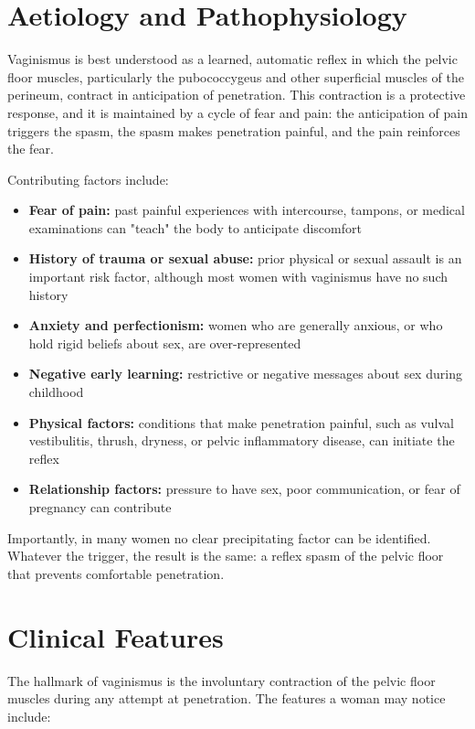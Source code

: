 \section*{Aetiology and Pathophysiology}
Vaginismus is best understood as a learned, automatic reflex in which the pelvic floor muscles, particularly the pubococcygeus and other superficial muscles of the perineum, contract in anticipation of penetration. This contraction is a protective response, and it is maintained by a cycle of fear and pain: the anticipation of pain triggers the spasm, the spasm makes penetration painful, and the pain reinforces the fear.

Contributing factors include:
\begin{itemize}
    \item \textbf{Fear of pain:} past painful experiences with intercourse, tampons, or medical examinations can "teach" the body to anticipate discomfort
    \item \textbf{History of trauma or sexual abuse:} prior physical or sexual assault is an important risk factor, although most women with vaginismus have no such history
    \item \textbf{Anxiety and perfectionism:} women who are generally anxious, or who hold rigid beliefs about sex, are over-represented
    \item \textbf{Negative early learning:} restrictive or negative messages about sex during childhood
    \item \textbf{Physical factors:} conditions that make penetration painful, such as vulval vestibulitis, thrush, dryness, or pelvic inflammatory disease, can initiate the reflex
    \item \textbf{Relationship factors:} pressure to have sex, poor communication, or fear of pregnancy can contribute
\end{itemize}

Importantly, in many women no clear precipitating factor can be identified. Whatever the trigger, the result is the same: a reflex spasm of the pelvic floor that prevents comfortable penetration.

\section*{Clinical Features}
The hallmark of vaginismus is the involuntary contraction of the pelvic floor muscles during any attempt at penetration. The features a woman may notice include:

